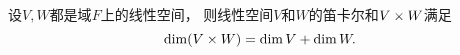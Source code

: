 \begin{theorem}\label{theorem:线性空间.笛卡尔和的维数公式}
设\(V,W\)都是域\(F\)上的线性空间，
则线性空间\(V\)和\(W\)的笛卡尔和\(V \times W\)满足\begin{equation*}
	\dim(V \times W) = \dim V + \dim W.
\end{equation*}
\end{theorem}
